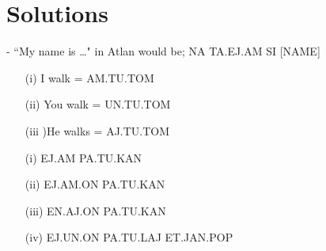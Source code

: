 \vfill 
\pagebreak
 

 

\section{Solutions}
\small

 -  “My name is …" in Atlan would be; NA TA.EJ.AM SI [NAME] \na \ta\ej\am \si {}. 

 

\begin{itemize}
    \item[(i)]I walk = AM.TU.TOM \am\tu\tom 

    \item[(ii)]You walk = UN.TU.TOM \un\tu\tom 

    \item[(iii])He walks = AJ.TU.TOM \aj\tu\tom 
\end{itemize}
 




\begin{itemize}
    \item[(i)]  EJ.AM PA.TU.KAN \ej\am \pa\tu\kan 

    \item[(ii)] EJ.AM.ON PA.TU.KAN \ej\am\on \pa\tu\kan 

    \item[(iii)]EN.AJ.ON PA.TU.KAN \ej\aj\on \pa\tu\kan 

    \item[(iv)]EJ.UN.ON PA.TU.LAJ ET.JAN.POP 
\item[] \ej\un\on \pa\tu\laj  \et\jan\pop 
\end{itemize}

